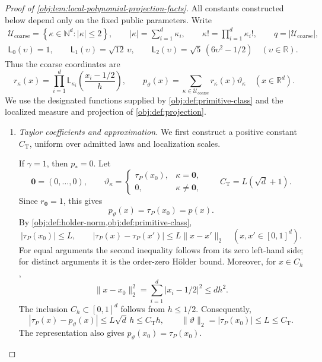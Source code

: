\begin{proof}[Proof of \cref{obj:lem:local-polynomial-projection-facts}]
All constants constructed below depend only on the fixed public parameters. Write
\[
\begin{gathered}
\mathcal U_{\mathrm{coarse}}
 =\left\{\kappa\in\mathbb N^d:|\kappa|\le2\right\},
\qquad
|\kappa|=\sum_{i=1}^d\kappa_i,
\qquad
\kappa!=\prod_{i=1}^d\kappa_i!,
\qquad
q=|\mathcal U_{\mathrm{coarse}}|,\\
\mathsf L_0(\upsilon)=1,\qquad
\mathsf L_1(\upsilon)=\sqrt{12}\,\upsilon,\qquad
\mathsf L_2(\upsilon)=\sqrt5\,(6\upsilon^2-1/2)
\quad(\upsilon\in\mathbb R).
\end{gathered}
\]
Thus the coarse coordinates are
\[
r_\kappa(x)
 =\prod_{i=1}^d
   \mathsf L_{\kappa_i}\!\left(\frac{x_i-1/2}{h}\right),
\qquad
p_\vartheta(x)=\sum_{\kappa\in\mathcal U_{\mathrm{coarse}}}
r_\kappa(x)\vartheta_\kappa
\quad(x\in\mathbb R^d).
\]
We use the designated functions supplied by \cref{obj:def:primitive-class} and the localized measure and projection of \cref{obj:def:projection}.

\begin{enumerate}
\item \emph{Taylor coefficients and approximation.}
We first construct a positive constant \(C_{\mathrm T}\), uniform over admitted laws and localization scales.

If \(\gamma=1\), then \(p_*=0\). Let
\[
\mathbf0=(0,\ldots,0),\qquad
\vartheta_\kappa=
\begin{cases}
\tau_P(x_0),&\kappa=\mathbf0,\\
0,&\kappa\ne\mathbf0,
\end{cases}
\qquad
C_{\mathrm T}=L(\sqrt d+1).
\]
Since \(r_{\mathbf0}=1\), this gives
\[
p_\vartheta(x)=\tau_P(x_0)=p(x).
\]
By \cref{obj:def:holder-norm,obj:def:primitive-class},
\[
|\tau_P(x_0)|\le L,
\qquad
|\tau_P(x)-\tau_P(x')|\le L\|x-x'\|_2
\quad(x,x'\in[0,1]^d).
\]
For equal arguments the second inequality follows from its zero left-hand side; for distinct arguments it is the order-zero Hölder bound. Moreover, for \(x\in C_h\),
\[
\|x-x_0\|_2^2
 =\sum_{i=1}^d|x_i-1/2|^2
 \le dh^2.
\]
The inclusion \(C_h\subset[0,1]^d\) follows from \(h\le1/2\). Consequently,
\[
|\tau_P(x)-p_\vartheta(x)|
 \le L\sqrt d\,h
 \le C_{\mathrm T}h,
\qquad
\|\vartheta\|_2=|\tau_P(x_0)|\le L\le C_{\mathrm T}.
\]
The representation also gives \(p_\vartheta(x_0)=\tau_P(x_0)\).


\end{enumerate}
\end{proof}
